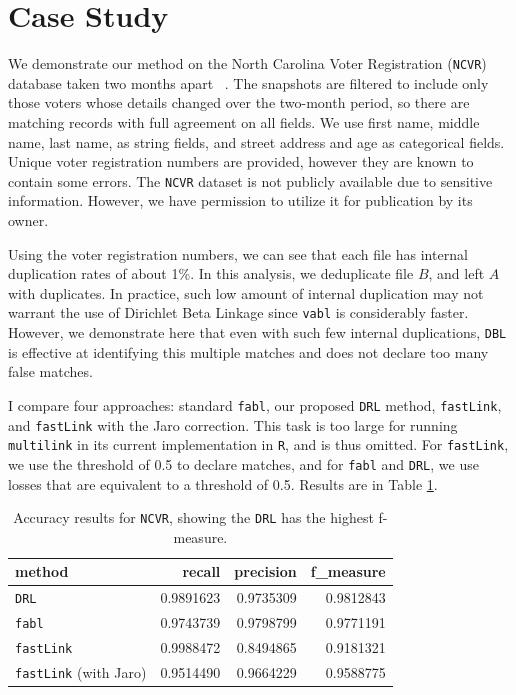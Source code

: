 \documentclass[12pt,letterpaper]{article}
\newcommand{\1}[1]{\mathbb{I}\!\left[#1\right]} %
\begin{document}
\section{Case Study}\label{sec:case-study}

We demonstrate our method on the North Carolina Voter Registration (\texttt{NCVR}) database taken two months apart ~\citep{christen_preparation_2014}. The snapshots are filtered to include only those voters whose details changed over the two-month period, so there are matching records with full agreement on all fields. We use first name, middle name, last name, as string fields, and street address and age as categorical fields. Unique voter registration numbers are provided, however they are known to contain some errors. The \texttt{NCVR} dataset is not publicly available due to sensitive information. However, we have permission to utilize it for publication by its owner.

Using the voter registration numbers, we can see that each file has internal duplication rates of about 1\%. In this analysis, we deduplicate file $B$, and left $A$ with duplicates. In practice, such low amount of internal duplication may not warrant the use of Dirichlet Beta Linkage since \texttt{vabl} is considerably faster. However, we demonstrate here that even with such few internal duplications, \texttt{DBL} is effective at identifying this multiple matches and does not declare too many false matches. 

I compare four approaches: standard \texttt{fabl}, our proposed \texttt{DRL} method, \texttt{fastLink}, and \texttt{fastLink} with the Jaro correction. This task is too large for running \texttt{multilink} in its current implementation in \texttt{R}, and is thus omitted. For \texttt{fastLink}, we use the threshold of 0.5 to declare matches, and for \texttt{fabl} and \texttt{DRL}, we use losses that are equivalent to a threshold of 0.5. Results are in Table \ref{table:ncvr_results}.

\begin{table}[t]
	\centering
	\begin{tabular}{l|rrr}
		
		method & recall & precision & f\_measure\\
		\hline
		\texttt{DRL} & 0.9891623 & 0.9735309 & 0.9812843\\
		\hline
		\texttt{fabl} & 0.9743739 & 0.9798799 & 0.9771191\\
		\hline
		\texttt{fastLink} & 0.9988472 & 0.8494865 & 0.9181321\\
		\hline
		\texttt{fastLink} (with Jaro) & 0.9514490 & 0.9664229 & 0.9588775\\
	\end{tabular}
	\caption{Accuracy results for \texttt{NCVR}, showing the \texttt{DRL} has the highest f-measure.}
	\label{table:ncvr_results}
\end{table}
\end{document}
